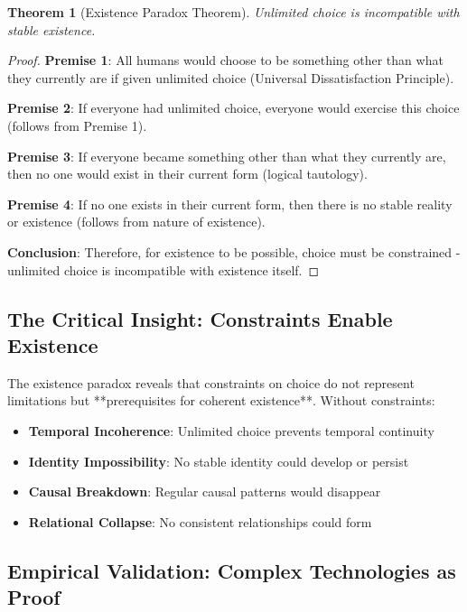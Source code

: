 \documentclass[11pt]{article}
\newtheorem{theorem}{Theorem}[section]
\theoremstyle{remark}
\begin{document}
\begin{theorem}[Existence Paradox Theorem]
Unlimited choice is incompatible with stable existence.
\end{theorem}

\begin{proof}
\textbf{Premise 1}: All humans would choose to be something other than what they currently are if given unlimited choice (Universal Dissatisfaction Principle).

\textbf{Premise 2}: If everyone had unlimited choice, everyone would exercise this choice (follows from Premise 1).

\textbf{Premise 3}: If everyone became something other than what they currently are, then no one would exist in their current form (logical tautology).

\textbf{Premise 4}: If no one exists in their current form, then there is no stable reality or existence (follows from nature of existence).

\textbf{Conclusion}: Therefore, for existence to be possible, choice must be constrained - unlimited choice is incompatible with existence itself.
\end{proof}

\subsection{The Critical Insight: Constraints Enable Existence}

The existence paradox reveals that constraints on choice do not represent limitations but **prerequisites for coherent existence**. Without constraints:

\begin{itemize}
\item \textbf{Temporal Incoherence}: Unlimited choice prevents temporal continuity
\item \textbf{Identity Impossibility}: No stable identity could develop or persist
\item \textbf{Causal Breakdown}: Regular causal patterns would disappear
\item \textbf{Relational Collapse}: No consistent relationships could form
\end{itemize}

\subsection{Empirical Validation: Complex Technologies as Proof}
\end{document}
